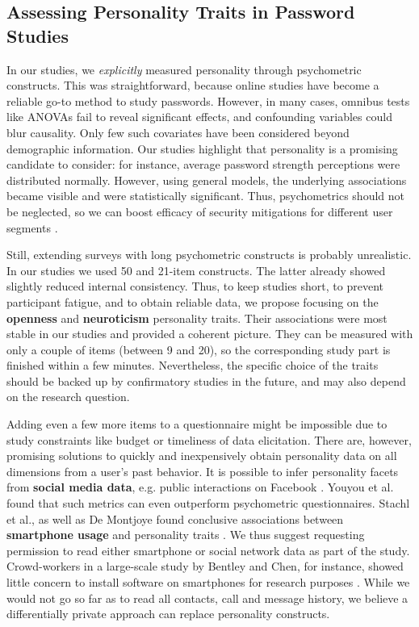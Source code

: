 \subsection{Assessing Personality Traits in Password Studies}
In our studies, we \textit{explicitly} measured personality through psychometric constructs. This was straightforward, because online studies have become a reliable go-to method to study passwords. However, in many cases, omnibus tests like ANOVAs fail to reveal significant effects, and confounding variables could blur causality. Only few such covariates have been considered beyond demographic information. Our studies highlight that personality is a promising candidate to consider: for instance, average password strength perceptions were distributed normally. However, using general models, the underlying associations became visible and were statistically significant. Thus, psychometrics should not be neglected, so we can boost efficacy of security mitigations for different user segments \cite{Egelman2015AverageUser}. 

Still, extending surveys with long psychometric constructs is probably unrealistic. In our studies we used 50 and 21-item constructs. The latter already showed slightly reduced internal consistency. Thus, to keep studies short, to prevent participant fatigue, and to obtain reliable data, we propose focusing on the \textbf{openness} and \textbf{neuroticism} personality traits. Their associations were most stable in our studies and provided a coherent picture. They can be measured with only a couple of items (between 9 and 20), so the corresponding study part is finished within a few minutes. Nevertheless, the specific choice of the traits should be backed up by confirmatory studies in the future, and may also depend on the research question.

Adding even a few more items to a questionnaire might be impossible due to study constraints like budget or timeliness of data elicitation. There are, however, promising solutions to quickly and inexpensively obtain personality data on all dimensions from a user's past behavior. It is possible to infer personality facets from \textbf{social media data}, e.g. public interactions on Facebook \cite{Youyou2015Personality}. Youyou et al. found that such metrics can even outperform psychometric questionnaires. Stachl et al., as well as De Montjoye \etal found conclusive associations between \textbf{smartphone usage} and personality traits \cite{DeMontjoye2013, Stachl2017PersonalitySmartphones}. We thus suggest requesting permission to read either smartphone or social network data as part of the study. Crowd-workers in a large-scale study by Bentley and Chen, for instance, showed little concern to install software on smartphones for research purposes \cite{Bentley2015Phonebook}. While we would not go so far as to read all contacts, call and message history, we believe a differentially private approach can replace personality constructs. 

